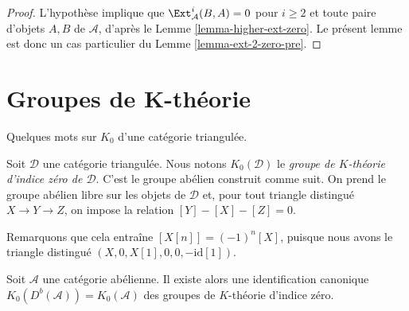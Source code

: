 \begin{proof}
L'hypothèse implique que $\Ext^i_\mathcal{A}(B, A) = 0$ pour $i \geq 2$
et toute paire d'objets $A, B$ de $\mathcal{A}$, d'après le
Lemme \ref{lemma-higher-ext-zero}. Le présent lemme est donc un cas
particulier du Lemme \ref{lemma-ext-2-zero-pre}.
\end{proof}

\section{Groupes de K-théorie}
\label{section-K-groups}

\noindent
Quelques mots sur $K_0$ d'une catégorie triangulée.

\begin{definition}
\label{definition-K-zero}
Soit $\mathcal{D}$ une catégorie triangulée. Nous notons $K_0(\mathcal{D})$ le
{\it groupe de $K$-théorie d'indice zéro de $\mathcal{D}$}. C'est le groupe
abélien construit comme suit. On prend le groupe abélien libre sur les objets
de $\mathcal{D}$ et, pour tout triangle distingué $X \to Y \to Z$, on impose
la relation $[Y] - [X] - [Z] = 0$.
\end{definition}

\noindent
Remarquons que cela entraîne $[X[n]] = (-1)^n[X]$, puisque nous avons le
triangle distingué $(X, 0, X[1], 0, 0, -\text{id}[1])$.

\begin{lemma}
\label{lemma-K-bounded-derived}
Soit $\mathcal{A}$ une catégorie abélienne. Il existe alors une identification
canonique $K_0(D^b(\mathcal{A})) = K_0(\mathcal{A})$ des groupes de $K$-théorie
d'indice zéro.
\end{lemma}

